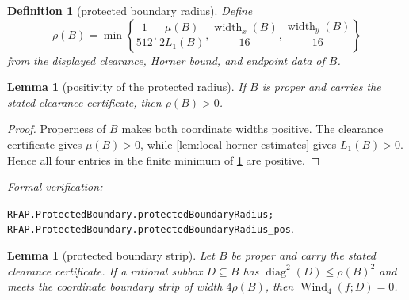 \documentclass[11pt]{article}
\newtheorem{lemma}[theorem]{Lemma}
\newtheorem{definition}[theorem]{Definition}
\newcommand{\Wind}{\operatorname{Wind}}
\newcommand{\diamq}{\operatorname{diag}^{2}}
\newcommand{\leanref}[1]{\par\smallskip\noindent
  \emph{Formal verification:}\par\nobreak
  {\raggedright\nolinkurl{#1}.\par}}
\begin{document}
\begin{definition}[protected boundary radius]
\label{def:protected-boundary-radius}
Define
\[
 \rho(B)=\min\left\{\frac1{512},
       \frac{\mu(B)}{2L_1(B)},
       \frac{\operatorname{width}_x(B)}{16},
       \frac{\operatorname{width}_y(B)}{16}\right\}
\]
from the displayed clearance, Horner bound, and endpoint data of $B$.
\end{definition}

\begin{lemma}[positivity of the protected radius]
\label{lem:protected-radius-positive}
If $B$ is proper and carries the stated clearance certificate, then
$\rho(B)>0$.
\end{lemma}

\begin{proof}
Properness of $B$ makes both coordinate widths positive.  The clearance
certificate gives $\mu(B)>0$, while
\cref{lem:local-horner-estimates} gives $L_1(B)>0$.  Hence all four entries
in the finite minimum of \cref{def:protected-boundary-radius} are positive.
\end{proof}

\leanref{RFAP.ProtectedBoundary.protectedBoundaryRadius;
RFAP.ProtectedBoundary.protectedBoundaryRadius_pos}

\begin{lemma}[protected boundary strip]
\label{lem:protected-strip}
Let $B$ be proper and carry the stated clearance certificate.  If a rational
subbox $D\subseteq B$ has $\diamq(D)\le\rho(B)^2$ and meets the coordinate
boundary strip of width $4\rho(B)$, then $\Wind_4(f;D)=0$.
\end{lemma}
\end{document}
